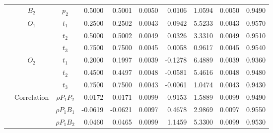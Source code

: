 \documentclass[letterpaper]{article}
\begin{document}
\begin{table}[h]
\begin{tabular}{cccrrrrrrr}
            & $B_2$       & $p_2$          & 0.5000                 & 0.5001                 & 0.0050                 & 0.0106                 & 1.0594                 & 0.0050                   & 0.9490                 \\
            & $O_1$       & $t_1$          & 0.2500                 & 0.2502                 & 0.0043                 & 0.0942                 & 5.5233                 & 0.0043                   & 0.9570                 \\
            &             & $t_2$          & 0.5000                 & 0.5002                 & 0.0049                 & 0.0326                 & 3.3310                 & 0.0049                   & 0.9510                 \\
            &             & $t_3$          & 0.7500                 & 0.7500                 & 0.0045                 & 0.0058                 & 0.9617                 & 0.0045                   & 0.9540                 \\
            & $O_2$       & $t_1$          & 0.2000                 & 0.1997                 & 0.0039                 & -0.1278                & 6.4889                 & 0.0039                   & 0.9360                 \\
            &             & $t_2$          & 0.4500                 & 0.4497                 & 0.0048                 & -0.0581                & 5.4616                 & 0.0048                   & 0.9480                 \\
            &             & $t_3$          & 0.7500                 & 0.7500                 & 0.0043                 & -0.0061                & 1.0474                 & 0.0043                   & 0.9430                 \\
            & Correlation & $\rho{P_1P_2}$ & 0.0172                 & 0.0171                 & 0.0099                 & -0.9153                & 1.5889                 & 0.0099                   & 0.9490                 \\
            &             & $\rho{P_1B_1}$ & -0.0619                & -0.0621                & 0.0097                 & 0.4678                 & 2.9869                 & 0.0097                   & 0.9550                 \\
            &             & $\rho{P_1B_2}$ & 0.0460                 & 0.0465                 & 0.0099                 & 1.1459                 & 5.3300                 & 0.0099                   & 0.9530                 \\

\end{tabular}
\end{table}
\end{document}
